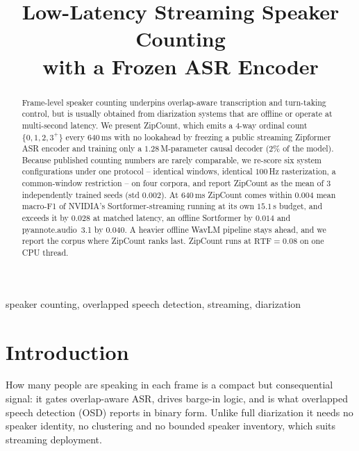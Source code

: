 \documentclass[10pt,conference]{IEEEtran}
\newcommand{\sys}{ZipCount}
\begin{document}
\title{Low-Latency Streaming Speaker Counting\\with a Frozen ASR Encoder}
\author{
}
\maketitle

\begin{abstract}
Frame-level speaker counting underpins overlap-aware transcription and
turn-taking control, but is usually obtained from diarization systems that
are offline or operate at multi-second latency. We present \sys{}, which
emits a 4-way ordinal count $\{0,1,2,3^{+}\}$ every $640$\,ms with no
lookahead by freezing a public streaming Zipformer ASR encoder and training
only a $1.28$\,M-parameter causal decoder ($2\%$ of the model). Because
published counting numbers are rarely comparable, we re-score six system
configurations under one protocol -- identical windows, identical
$100$\,Hz rasterization, a common-window restriction -- on four corpora,
and report \sys{} as the mean of 3 independently trained seeds (std
$0.002$). At $640$\,ms \sys{} comes within $0.004$ mean macro-F1 of
NVIDIA's Sortformer-streaming running at its own $15.1$\,s budget, and
exceeds it by $0.028$ at matched latency, an offline Sortformer by $0.014$
and pyannote.audio~3.1 by $0.040$. A heavier offline WavLM pipeline stays
ahead, and we report the corpus where \sys{} ranks last. \sys{} runs at
$\mathrm{RTF}=0.08$ on one CPU thread.
\end{abstract}

\begin{IEEEkeywords}
speaker counting, overlapped speech detection, streaming, diarization
\end{IEEEkeywords}

\section{Introduction}

How many people are speaking in each frame is a compact but consequential
signal: it gates overlap-aware ASR, drives barge-in logic, and is what
overlapped speech detection (OSD) reports in binary form. Unlike full
diarization it needs no speaker identity, no clustering and no bounded
speaker inventory, which suits streaming deployment.
\end{document}
